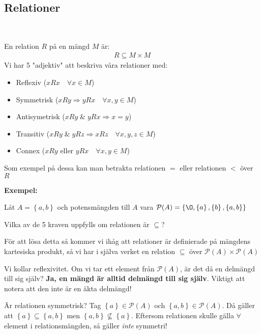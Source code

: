 \subsection{Relationer}\hfill\\\par
\noindent En relation $R$ på en mängd $M$ är:
\begin{equation*}
  \begin{gathered}
    R\subseteq M\times M
  \end{gathered}
\end{equation*}
\noindent Vi har 5 "adjektiv" att beskriva våra relationer med:\par
\begin{itemize}
  \item Reflexiv ($xRx\quad\forall x\in M$)
  \item Symmetrisk ($xRy\Rightarrow yRx\quad\forall x,y\in M$)
  \item Antisymetrisk ($xRy\;\&\;yRx\Rightarrow x=y$)
  \item Transitiv ($xRy\;\&\;yRz\Rightarrow xRz\quad\forall x,y,z\in M$)
  \item Connex ($xRy\text{ eller } yRx\quad\forall x,y\in M$)
\end{itemize}
\par\bigskip
\noindent Som exempel på dessa kan man betrakta relationen $=$ eller relationen $<$ över $R$
\par\bigskip
\noindent\textbf{Exempel:}\par
\noindent Låt $A = \left\{a,b\right\}$ och potensmängden till $A$ vara $\mathcal{P}(A) = \left\{\O,\left\{a\right\},\left\{b\right\},\left\{a,b\right\}\right\}$\par
\noindent Vilka av de 5 kraven uppfylls om relationen är $\subseteq$?
\par\bigskip
\noindent För att lösa detta så kommer vi ihåg att relationer är definierade på mängdens kartesiska produkt, så vi har i själva verket en relation $\subseteq$ över $\mathcal{P}(A)\times\mathcal{P}(A)$\par
\noindent Vi kollar reflexivitet. Om vi tar ett element från $\mathcal{P}(A)$, är det då en delmängd till sig själv? \textbf{Ja, en mängd är alltid delmängd till sig själv}. Viktigt att notera att den inte är en äkta delmängd!
\par\bigskip
\noindent Är relationen symmetrisk? Tag $\left\{a\right\}\in\mathcal{P}(A)$ och $\left\{a,b\right\}\in\mathcal{P}(A)$. Då gäller att $\left\{a\right\}\subseteq\left\{a,b\right\}$ men $\left\{a,b\right\}\not\subseteq\left\{a\right\}$. Eftersom relationen skulle gälla $\forall$ element i relationsmängden, så gäller \textit{inte} symmetri!
